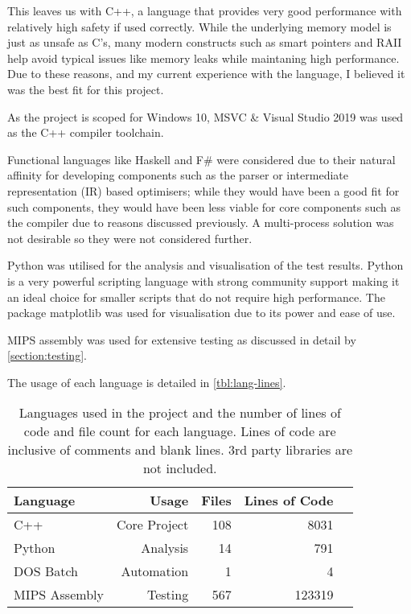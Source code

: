 This leaves us with C++, a language that provides very good performance with relatively high safety if used correctly. While the underlying memory model is just as unsafe as C's, many modern constructs such as smart pointers \cite{cpp-smart-ptrs} and RAII \cite{cpp-raii} help avoid typical issues like memory leaks while maintaning high performance. Due to these reasons, and my current experience with the language, I believed it was the best fit for this project.

As the project is scoped for Windows 10, MSVC \& Visual Studio 2019 was used as the C++ compiler toolchain.

Functional languages like Haskell and F\# were considered due to their natural affinity for developing components such as the parser or intermediate representation (IR) based optimisers; while they would have been a good fit for such components, they would have been less viable for core components such as the compiler due to reasons discussed previously. A multi-process solution was not desirable so they were not considered further.

Python was utilised for the analysis and visualisation of the test results. Python is a very powerful scripting language with strong community support making it an ideal choice for smaller scripts that do not require high performance. The package matplotlib was used for visualisation due to its power and ease of use.

MIPS assembly was used for extensive testing as discussed in detail by \autoref{section:testing}.

The usage of each language is detailed in \autoref{tbl:lang-lines}.

\begin{table}[h] 
    \centering
    \begin{tabular}{l|rrrr}
        \toprule
        Language & Usage & Files & Lines of Code \\
        \midrule
        C++ & Core Project & 108 & 8031 \\
        Python & Analysis & 14 & 791 \\
        DOS Batch & Automation & 1 & 4 \\
        MIPS Assembly & Testing & 567 & 123319 \\
        \bottomrule
    \end{tabular}
    \caption{Languages used in the project and the number of lines of code and file count for each language. Lines of code are inclusive of comments and blank lines. 3rd party libraries are not included.}
    \label{tbl:lang-lines}
\end{table}